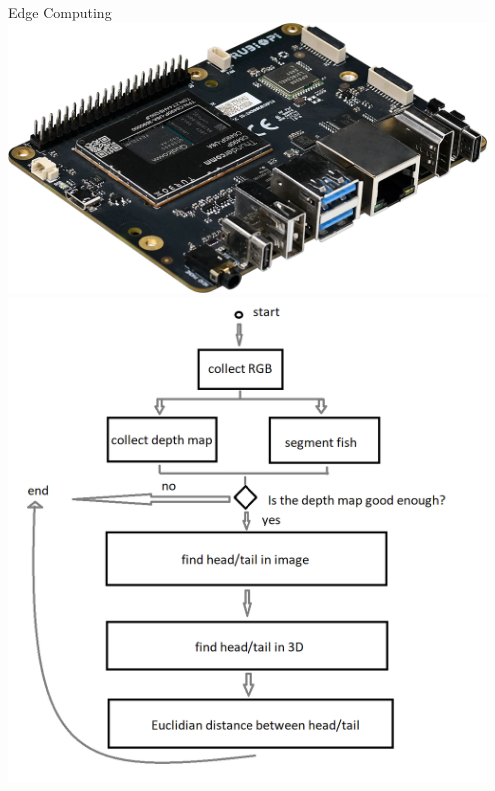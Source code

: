 \begin{frame}{Edge Computing}
    \centering
    \includegraphics[height=0.8\textheight,width=0.95\textwidth,keepaspectratio]{images/rubik-pi-3-1.png}
    \includegraphics[height=0.8\textheight,width=0.95\textwidth,keepaspectratio]{images/dwe-diagram.png}

\end{frame}

